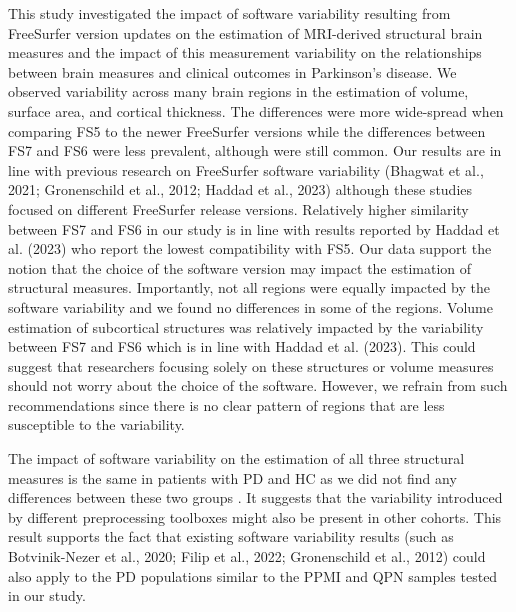 \documentclass[11pt]{article}
\begin{document}
This study investigated the impact of software variability resulting from FreeSurfer version updates on the
estimation of MRI-derived structural brain measures and the impact of this measurement variability on the
relationships between brain measures and clinical outcomes in Parkinson's disease. We observed variability across
many brain regions in the estimation of volume, surface area, and cortical thickness. The differences were more
wide-spread when comparing FS5 to the newer FreeSurfer versions while the differences between FS7 and FS6 were less
prevalent, although were still common.  Our results are in line with previous research on FreeSurfer software variability
(Bhagwat et al., 2021; Gronenschild et al., 2012; Haddad et al., 2023) although these studies focused on different
FreeSurfer release versions. Relatively higher similarity between FS7 and FS6 in our study is in line with results
reported by Haddad et al. (2023) who report the lowest compatibility with FS5. Our data support the notion that the
choice of the software version may impact the estimation of structural measures. Importantly, not all regions were
equally impacted by the software variability and we found no differences in some of the regions. Volume estimation
of subcortical structures was relatively  impacted by the variability between FS7 and FS6 which is in
line with Haddad et al. (2023). This could suggest that researchers focusing solely on these structures or volume
measures should not worry about the choice of the software. However, we refrain from such recommendations since
there is no clear pattern of regions that are less susceptible to the variability.


The impact of software variability on the estimation of all three structural measures is the same in patients
with PD and HC as we did not find any differences between these two groups .
It suggests that the variability introduced by different preprocessing toolboxes might also be present in other
cohorts. This result supports the fact that existing software variability results (such as Botvinik-Nezer et al.,
2020; Filip et al., 2022; Gronenschild et al., 2012) could also apply to the PD populations similar to the PPMI and
QPN samples tested in our study.
\end{document}
